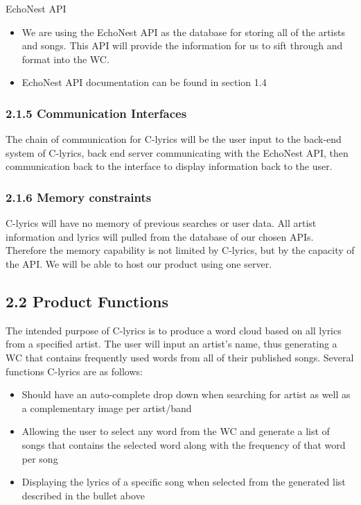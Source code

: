\documentclass[]{article}
\begin{document}
EchoNest API

\begin{itemize}
\itemsep1pt\parskip0pt
\item
  We are using the EchoNest API as the database for storing all of the
  artists and songs. This API will provide the information for us to
  sift through and format into the WC.
\item
  EchoNest API documentation can be found in section 1.4
\end{itemize}

\subsubsection{2.1.5 Communication
Interfaces}\label{communication-interfaces}

The chain of communication for C-lyrics will be the user input to the
back-end system of C-lyrics, back end server communicating with the
EchoNest API, then communication back to the interface to display
information back to the user.

\subsubsection{2.1.6 Memory constraints}\label{memory-constraints}

C-lyrics will have no memory of previous searches or user data. All
artist information and lyrics will pulled from the database of our
chosen APIs. Therefore the memory capability is not limited by C-lyrics,
but by the capacity of the API. We will be able to host our product
using one server.

\subsection{2.2 Product Functions}\label{product-functions}

The intended purpose of C-lyrics is to produce a word cloud based on all
lyrics from a specified artist. The user will input an artist's name,
thus generating a WC that contains frequently used words from all of
their published songs. Several functions C-lyrics are as follows:

\begin{itemize}
\itemsep1pt\parskip0pt
\item
  Should have an auto-complete drop down when searching for artist as
  well as a complementary image per artist/band
\item
  Allowing the user to select any word from the WC and generate a list
  of songs that contains the selected word along with the frequency of
  that word per song
\item
  Displaying the lyrics of a specific song when selected from the
  generated list described in the bullet above
\end{itemize}
\end{document}
